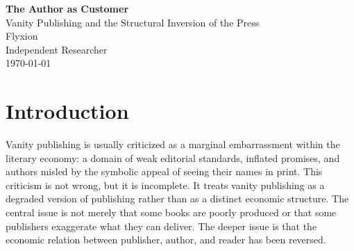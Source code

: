 \documentclass[12pt, a4paper]{article}
\begin{document}
\begin{center}
{\LARGE\bfseries The Author as Customer}\\[0.5em]
{\large Vanity Publishing and the Structural Inversion of the Press}\\[1.5em]
{\normalsize Flyxion}\\
{\small Independent Researcher}\\[0.3em]
{\small\today}
\end{center}

\vspace{1em}

\begin{abstract}
\noindent This essay argues that vanity publishing is not best understood as a quality problem but as an economic inversion. In conventional publishing, revenue flows from readers to publishers, which aligns the publisher's financial interest with the public circulation of work. In vanity publishing, the author replaces the reader as the primary revenue source, decoupling editorial selection from audience demand and transferring risk from the institution to the creator. The essay develops a structural account of this inversion, distinguishes it from legitimate self-publishing and service provision, and situates it within a broader platform pattern in which participation itself becomes the billable surface. It further argues that generative AI platforms represent the most complete form of this inversion, in which the user pays for access while simultaneously performing the labor of system improvement that the platform would otherwise have to purchase.
\end{abstract}

\newpage

\section{Introduction}

Vanity publishing is usually criticized as a marginal embarrassment within the literary economy: a domain of weak editorial standards, inflated promises, and authors misled by the symbolic appeal of seeing their names in print. This criticism is not wrong, but it is incomplete. It treats vanity publishing as a degraded version of publishing rather than as a distinct economic structure. The central issue is not merely that some books are poorly produced or that some publishers exaggerate what they can deliver. The deeper issue is that the economic relation between publisher, author, and reader has been reversed.
\end{document}

